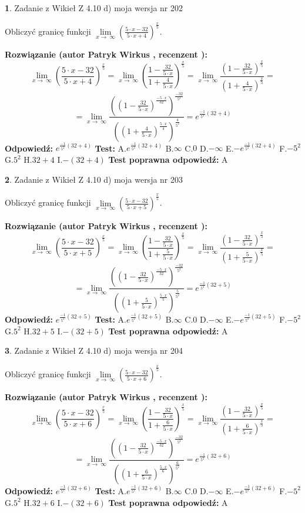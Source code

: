 \documentclass[12pt, a4paper]{article}
\theoremstyle{definition} %
\newtheorem{zad}{}
\newcommand{\zadStart}[1]{\begin{zad}#1\newline}
\newcommand{\zadStop}{\end{zad}}
\newcommand{\rozwStart}[2]{\noindent \textbf{Rozwiązanie (autor #1 , recenzent #2): }\newline}
\newcommand{\rozwStop}{\newline}
\newcommand{\odpStart}{\noindent \textbf{Odpowiedź:}\newline}
\newcommand{\odpStop}{\newline}
\newcommand{\testStart}{\noindent \textbf{Test:}\newline}
\newcommand{\testStop}{\newline}
\newcommand{\kluczStart}{\noindent \textbf{Test poprawna odpowiedź:}\newline}
\newcommand{\kluczStop}{\newline}
\begin{document}
\zadStart{Zadanie z Wikieł Z 4.10 d) moja wersja nr 202}


Obliczyć granicę funkcji  $\lim\limits_{x\to\ \infty}(\frac{5\cdot x-32}{5\cdot x+4})^{\frac{x}{5}}$.
\zadStop
\rozwStart{Patryk Wirkus}{}
$$\lim\limits_{x\to\ \infty}(\frac{5\cdot x-32}{5\cdot x+4})^{\frac{x}{5}} = \lim\limits_{x\to\ \infty}(\frac{1-\frac{32}{5\cdot x}}{1+\frac{4}{5\cdot x}})^{\frac{x}{5}}=\lim\limits_{x\to\ \infty}\frac{(1-\frac{32}{5\cdot x})^{\frac{x}{5}}}{(1+\frac{4}{5\cdot x})^{\frac{x}{5}}}=$$
$$=\lim\limits_{x\to\ \infty}\frac{((1-\frac{32}{5\cdot x})^{\frac{-5\cdot x}{32}})^{\frac{-32}{5^{2}}}}{((1+\frac{4}{5\cdot x})^{\frac{5\cdot x}{4}})^{\frac{4}{5^{2}}}}=e^{\frac{-1}{5^{2}}(32+4)}$$
\rozwStop
\odpStart
$e^{\frac{-1}{5^{2}}(32+4)}$
\odpStop
\testStart
A.$e^{\frac{-1}{5^{2}}(32+4)}$ B.$\infty$ C.$0$ D.$-\infty$ E.$-e^{\frac{-1}{5^{2}}(32+4)}$
F.$-5^{2}$ G.$5^{2}$
H.$32+4$
I.$-(32+4)$
\testStop
\kluczStart
A
\kluczStop



\zadStart{Zadanie z Wikieł Z 4.10 d) moja wersja nr 203}


Obliczyć granicę funkcji  $\lim\limits_{x\to\ \infty}(\frac{5\cdot x-32}{5\cdot x+5})^{\frac{x}{5}}$.
\zadStop
\rozwStart{Patryk Wirkus}{}
$$\lim\limits_{x\to\ \infty}(\frac{5\cdot x-32}{5\cdot x+5})^{\frac{x}{5}} = \lim\limits_{x\to\ \infty}(\frac{1-\frac{32}{5\cdot x}}{1+\frac{5}{5\cdot x}})^{\frac{x}{5}}=\lim\limits_{x\to\ \infty}\frac{(1-\frac{32}{5\cdot x})^{\frac{x}{5}}}{(1+\frac{5}{5\cdot x})^{\frac{x}{5}}}=$$
$$=\lim\limits_{x\to\ \infty}\frac{((1-\frac{32}{5\cdot x})^{\frac{-5\cdot x}{32}})^{\frac{-32}{5^{2}}}}{((1+\frac{5}{5\cdot x})^{\frac{5\cdot x}{5}})^{\frac{5}{5^{2}}}}=e^{\frac{-1}{5^{2}}(32+5)}$$
\rozwStop
\odpStart
$e^{\frac{-1}{5^{2}}(32+5)}$
\odpStop
\testStart
A.$e^{\frac{-1}{5^{2}}(32+5)}$ B.$\infty$ C.$0$ D.$-\infty$ E.$-e^{\frac{-1}{5^{2}}(32+5)}$
F.$-5^{2}$ G.$5^{2}$
H.$32+5$
I.$-(32+5)$
\testStop
\kluczStart
A
\kluczStop



\zadStart{Zadanie z Wikieł Z 4.10 d) moja wersja nr 204}


Obliczyć granicę funkcji  $\lim\limits_{x\to\ \infty}(\frac{5\cdot x-32}{5\cdot x+6})^{\frac{x}{5}}$.
\zadStop
\rozwStart{Patryk Wirkus}{}
$$\lim\limits_{x\to\ \infty}(\frac{5\cdot x-32}{5\cdot x+6})^{\frac{x}{5}} = \lim\limits_{x\to\ \infty}(\frac{1-\frac{32}{5\cdot x}}{1+\frac{6}{5\cdot x}})^{\frac{x}{5}}=\lim\limits_{x\to\ \infty}\frac{(1-\frac{32}{5\cdot x})^{\frac{x}{5}}}{(1+\frac{6}{5\cdot x})^{\frac{x}{5}}}=$$
$$=\lim\limits_{x\to\ \infty}\frac{((1-\frac{32}{5\cdot x})^{\frac{-5\cdot x}{32}})^{\frac{-32}{5^{2}}}}{((1+\frac{6}{5\cdot x})^{\frac{5\cdot x}{6}})^{\frac{6}{5^{2}}}}=e^{\frac{-1}{5^{2}}(32+6)}$$
\rozwStop
\odpStart
$e^{\frac{-1}{5^{2}}(32+6)}$
\odpStop
\testStart
A.$e^{\frac{-1}{5^{2}}(32+6)}$ B.$\infty$ C.$0$ D.$-\infty$ E.$-e^{\frac{-1}{5^{2}}(32+6)}$
F.$-5^{2}$ G.$5^{2}$
H.$32+6$
I.$-(32+6)$
\testStop
\kluczStart
A
\kluczStop
\end{document}
